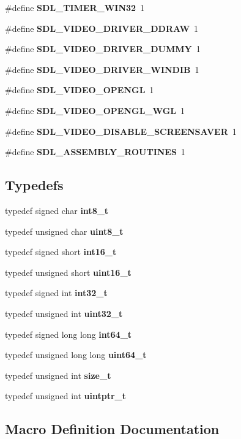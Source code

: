 \begin{DoxyCompactItemize}
\item 
\#define {\bf S\+D\+L\+\_\+\+T\+I\+M\+E\+R\+\_\+\+W\+I\+N32}~1
\item 
\#define {\bf S\+D\+L\+\_\+\+V\+I\+D\+E\+O\+\_\+\+D\+R\+I\+V\+E\+R\+\_\+\+D\+D\+R\+A\+W}~1
\item 
\#define {\bf S\+D\+L\+\_\+\+V\+I\+D\+E\+O\+\_\+\+D\+R\+I\+V\+E\+R\+\_\+\+D\+U\+M\+M\+Y}~1
\item 
\#define {\bf S\+D\+L\+\_\+\+V\+I\+D\+E\+O\+\_\+\+D\+R\+I\+V\+E\+R\+\_\+\+W\+I\+N\+D\+I\+B}~1
\item 
\#define {\bf S\+D\+L\+\_\+\+V\+I\+D\+E\+O\+\_\+\+O\+P\+E\+N\+G\+L}~1
\item 
\#define {\bf S\+D\+L\+\_\+\+V\+I\+D\+E\+O\+\_\+\+O\+P\+E\+N\+G\+L\+\_\+\+W\+G\+L}~1
\item 
\#define {\bf S\+D\+L\+\_\+\+V\+I\+D\+E\+O\+\_\+\+D\+I\+S\+A\+B\+L\+E\+\_\+\+S\+C\+R\+E\+E\+N\+S\+A\+V\+E\+R}~1
\item 
\#define {\bf S\+D\+L\+\_\+\+A\+S\+S\+E\+M\+B\+L\+Y\+\_\+\+R\+O\+U\+T\+I\+N\+E\+S}~1
\end{DoxyCompactItemize}
\subsection*{Typedefs}
\begin{DoxyCompactItemize}
\item 
typedef signed char {\bf int8\+\_\+t}
\item 
typedef unsigned char {\bf uint8\+\_\+t}
\item 
typedef signed short {\bf int16\+\_\+t}
\item 
typedef unsigned short {\bf uint16\+\_\+t}
\item 
typedef signed int {\bf int32\+\_\+t}
\item 
typedef unsigned int {\bf uint32\+\_\+t}
\item 
typedef signed long long {\bf int64\+\_\+t}
\item 
typedef unsigned long long {\bf uint64\+\_\+t}
\item 
typedef unsigned int {\bf size\+\_\+t}
\item 
typedef unsigned int {\bf uintptr\+\_\+t}
\end{DoxyCompactItemize}


\subsection{Macro Definition Documentation}

